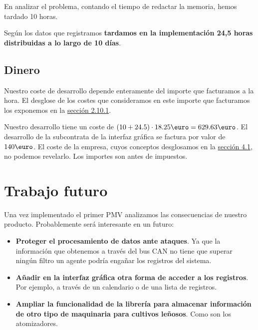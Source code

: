 En analizar el problema, contando el tiempo de redactar la memoria,
hemos tardado 10 horas.

Según los datos que registramos \textbf{tardamos en la implementación 24,5 horas distribuidas a lo largo de
10 días}.

\subsection{Dinero}

Nuestro coste de desarrollo depende enteramente del importe que
facturamos a la hora. El desglose de los costes que consideramos
en este importe que facturamos los exponemos en la
\hyperref[sec:precio_hora]{sección 2.10.1}.

Nuestro desarrollo tiene un coste de $(10 + 24.5) \cdot 18.25\mbox{\euro} = 629.63\mbox{\euro}$. 
El desarrollo de la subcontrata de la interfaz gráfica se factura por valor de $140\mbox{\euro}$.
El coste de la empresa, cuyos conceptos desglosamos en la \hyperref[sec:estimación_de_costes]{sección 4.1},
no podemos revelarlo.
Los importes son antes de impuestos.

\section{Trabajo futuro}

Una vez implementado el primer PMV analizamos las consecuencias de
nuestro producto. Probablemente será interesante en un futuro:

\begin{itemize}[noitemsep,nolistsep]
    \item \textbf{Proteger el procesamiento de datos ante ataques}. Ya que
          la información que obtenemos a través del bus CAN no
          tiene que superar ningún filtro un agente podría engañar
          los registros del sistema.
    \item \textbf{Añadir en la interfaz gráfica otra forma de acceder a los
          registros}. Por ejemplo, a través de un calendario o de una
          lista de registros.
    \item \textbf{Ampliar la funcionalidad de la librería para almacenar
          información de otro tipo de maquinaria para cultivos leñosos}.
          Como son los atomizadores.
\end{itemize}
